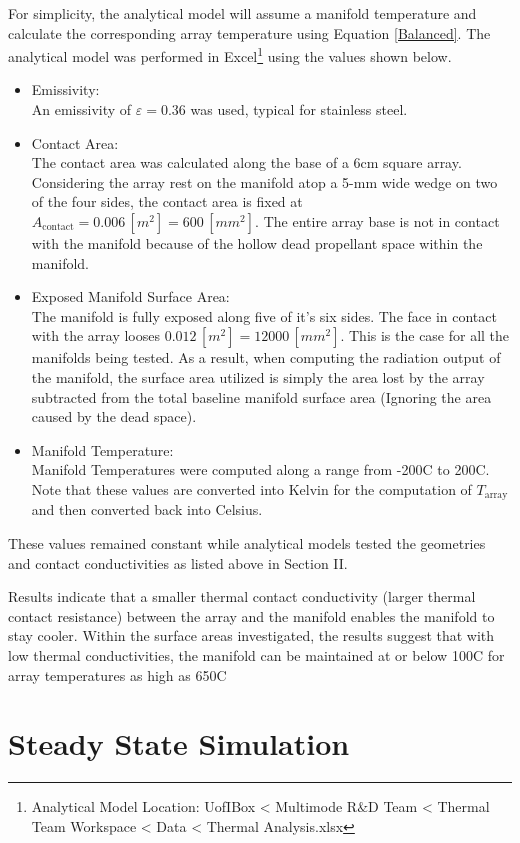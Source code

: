 \documentclass[journal]{new-aiaa}
\begin{document}
For simplicity, the analytical model will assume a manifold temperature and calculate the corresponding array temperature using Equation \ref{Balanced}. The analytical model was performed in Excel\footnote{Analytical Model Location: UofIBox < Multimode R$\&$D Team < Thermal Team Workspace < Data < Thermal Analysis.xlsx} using the values shown below. 
\begin{itemize}
\item Emissivity:\\
	An emissivity of $\varepsilon=0.36$ was used, typical for stainless steel.
\item Contact Area: \\
	The contact area was calculated along the base of a 6cm square array. Considering the array rest on the manifold atop a 5-mm wide wedge on two of the four sides, the contact area is fixed at $A_{\text{contact}} = 0.006 \, [m^2] = 600 \, [mm^2]$. The entire array base is not in contact with the manifold because of the hollow dead propellant space within the manifold.
\item Exposed Manifold Surface Area: \\
	The manifold is fully exposed along five of it's six sides. The face in contact with the array looses $0.012 \, [m^2] = 12000 \, [mm^2]$. This is the case for all the manifolds being tested. As a result, when computing the radiation output of the manifold, the surface area utilized is simply the area lost by the array subtracted from the total baseline manifold surface area (Ignoring the area caused by the dead space).
\item Manifold Temperature: \\
	Manifold Temperatures were computed along a range from -200C to 200C. Note that these values are converted into Kelvin for the computation of $T_{\text{array}}$ and then converted back into Celsius. 
\end{itemize}
These values remained constant while analytical models tested the geometries and contact conductivities as listed above in Section II.

Results indicate that a smaller thermal contact conductivity (larger thermal contact resistance) between the array and the manifold enables the manifold to stay cooler. Within the surface areas investigated, the results suggest that with low thermal conductivities, the manifold can be maintained at or below 100C for array temperatures as high as 650C

\section{Steady State Simulation }
\end{document}
